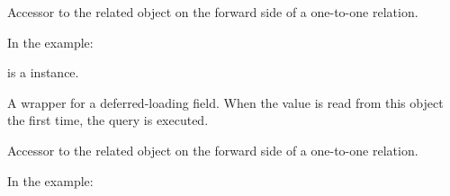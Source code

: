 \documentclass[letterpaper,10pt,english]{sphinxmanual}
\begin{document}
\begin{fulllineitems}
\begin{fulllineitems}
\end{fulllineitems}


\begin{fulllineitems}
\label{\detokenize{QuChemPedIA.models:QuChemPedIA.models.ImportRuleModel.ImportRule.id_software}}
Accessor to the related object on the forward side of a one-to-one relation.

In the example:

%
\begin{sphinxVerbatim}[commandchars=\\\{\}]
 
       
\end{sphinxVerbatim}

 is a  instance.

\end{fulllineitems}


\begin{fulllineitems}
\label{\detokenize{QuChemPedIA.models:QuChemPedIA.models.ImportRuleModel.ImportRule.id_software_id}}
A wrapper for a deferred-loading field. When the value is read from this
object the first time, the query is executed.

\end{fulllineitems}


\begin{fulllineitems}
\label{\detokenize{QuChemPedIA.models:QuChemPedIA.models.ImportRuleModel.ImportRule.id_version}}
Accessor to the related object on the forward side of a one-to-one relation.

In the example:

%
\begin{sphinxVerbatim}[commandchars=\\\{\}]
 
       
\end{sphinxVerbatim}


\end{fulllineitems}
\end{fulllineitems}
\end{document}
